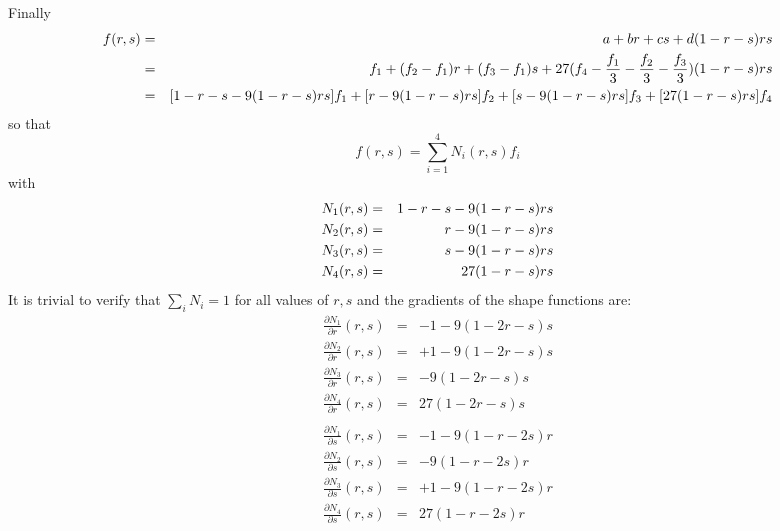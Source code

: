 Finally
\begin{eqnarray}
f(r,s) 
&=&a+br+cs + d (1-r-s)rs \nonumber\\
&=& f_1 + (f_2-f_1)r + (f_3-f_1)s + 27(f_4 - \frac{f_1}{3}  - \frac{f_2}{3}  - \frac{f_3}{3} ) (1-r-s)rs \nonumber\\
&=& [1-r-s-9(1-r-s)rs] f_1 + [r-9(1-r-s)rs ]f_2 + [s-9(1-r-s)rs ]f_3 + [27(1-r-s)rs]f_4 \nonumber
\end{eqnarray}
so that 
\[
f(r,s)=\sum_{i=1}^4 N_i(r,s) f_i
\]
with 
\begin{eqnarray}
N_1(r,s) &=& 1-r-s-9(1-r-s)rs \nonumber\\
N_2(r,s) &=& r-9(1-r-s)rs \nonumber\\
N_3(r,s) &=& s-9(1-r-s)rs \nonumber\\
N_4(r,s) &=& 27(1-r-s)rs \nonumber
\end{eqnarray}
It is trivial to verify that $\sum_i N_i =1$ for all values of $r,s$
and the gradients of the shape functions are:
\begin{eqnarray}
\frac{\partial N_1}{\partial r}(r,s) &=& -1 - 9(1-2r-s)s \\ 
\frac{\partial N_2}{\partial r}(r,s) &=&  +1 - 9(1-2r-s)s \\ 
\frac{\partial N_3}{\partial r}(r,s) &=&  - 9(1-2r-s)s \\ 
\frac{\partial N_4}{\partial r}(r,s) &=&  27(1-2r-s)s \\ 
\\
\frac{\partial N_1}{\partial s}(r,s) &=& -1 - 9(1-r-2s)r \\ 
\frac{\partial N_2}{\partial s}(r,s) &=&    - 9(1-r-2s)r \\ 
\frac{\partial N_3}{\partial s}(r,s) &=& +1 - 9(1-r-2s)r \\ 
\frac{\partial N_4}{\partial s}(r,s) &=&     27(1-r-2s)r 
\end{eqnarray}

